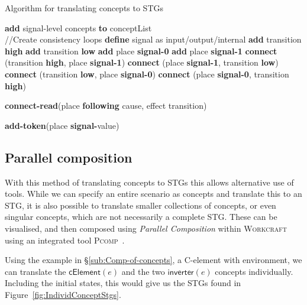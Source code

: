 \documentclass[british,compsoc]{IEEEtran}
\newcommand{\noun}[1]{\textsc{#1}}
\begin{document}
\begin{algorithm}[t]
\begin{algorithmic}
\caption{Algorithm for translating concepts to STGs\label{alg:translation}}
  \State \textbf{add} signal-level concepts \textbf{to} conceptList
\EndFor \\

//Create consistency loops
  \State \textbf{define} signal as input/output/internal
  \State \textbf{add} transition \textbf{high}
  \State \textbf{add} transition \textbf{low}
  \State \textbf{add} place \textbf{signal-0}
  \State \textbf{add} place \textbf{signal-1}
  \State \textbf{connect} (transition \textbf{high}, place \textbf{signal-1})
  \State \textbf{connect} (place \textbf{signal-1}, transition \textbf{low})
  \State \textbf{connect} (transition \textbf{low}, place \textbf{signal-0})
  \State \textbf{connect} (place \textbf{signal-0}, transition \textbf{high})
\EndFor

  \State \textbf{connect-read}(place \textbf{following} cause, effect transition)
\EndFor

  \State \textbf{add-token}(place \textbf{signal-}value)
\EndFor

\end{algorithmic}
\end{algorithm}

\subsection{Parallel composition}

With this method of translating concepts to STGs this allows alternative use of tools. While we can specify an entire scenario as concepts and translate this to an STG, it is also possible to
translate smaller collections of concepts, or even singular concepts, which are not necessarily a complete STG. These can be visualised, and then composed using
\emph{Parallel Composition}
within \noun{Workcraft} using an integrated tool \noun{Pcomp}~\cite{PCOMP}.

Using the example in \S\ref{sub:Comp-of-concepts}, a C-element with environment, we can translate the $\mathsf{cElement}(e)$ and the two $\mathsf{inverter}(e)$ concepts
individually. Including the initial states, this would give us the STGs found in Figure~\ref{fig:IndividConceptStgs}.
\end{document}
